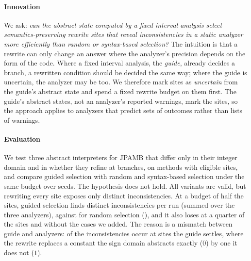 \paragraph{Innovation}
We ask: \emph{can the abstract state computed by a fixed interval analysis select
semantics-preserving rewrite sites that reveal inconsistencies in a static
analyzer more efficiently than random or syntax-based selection?} The
intuition is that a rewrite can only change an answer where the analyzer's
precision depends on the form of the code. Where a fixed interval analysis,
the \emph{guide}, already decides a branch, a rewritten condition should be
decided the same way; where the guide is uncertain, the analyzer may be too.
We therefore mark sites as \emph{uncertain} from the guide's abstract state and
spend a fixed rewrite budget on them first. The guide's abstract states, not an
analyzer's reported warnings, mark the sites, so the approach applies to
analyzers that predict sets of outcomes rather than lists of warnings.

\paragraph{Evaluation}
We test three abstract interpreters for JPAMB that differ only in their integer
domain and in whether they refine at branches, on \NumMethods{} methods with
\NumSites{} eligible sites, and compare guided selection with random and
syntax-based selection under the same budget over \NumSeeds{} seeds. The
hypothesis does not hold. All \NumValid{} variants are valid, but rewriting
every site exposes only \Pool{} distinct inconsistencies. At a budget of half the sites, guided selection finds
\MeanGuidedHalf{} distinct inconsistencies per run (summed over the three
analyzers), against \MeanRandomHalf{} for random selection
(\PGuidedRandomHalf), and it also loses at a quarter of the sites and without
the cases we added. The reason is a mismatch between guide and analyzers:
\PoolFromSettledOnly{} of the \Pool{} inconsistencies occur at sites the guide
settles, where the rewrite replaces a constant the sign domain abstracts
exactly ($0$) by one it does not ($1$).

